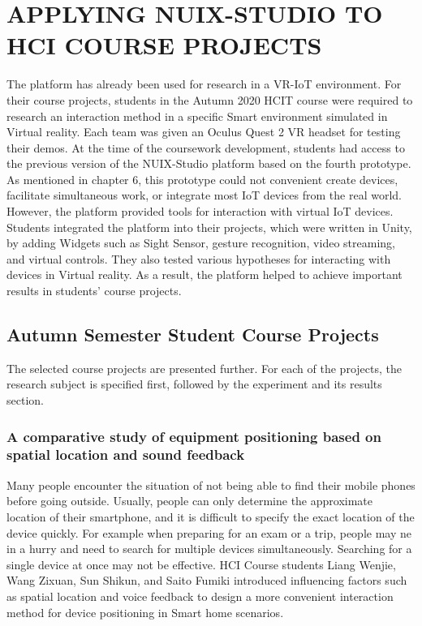 
\chapter{\MakeUppercase{Applying NUIX-Studio to HCI Course Projects}}

The platform has already been used for research in a VR-IoT environment.
For their course projects, students in the Autumn 2020 HCIT course were required to research an interaction method in a specific Smart environment simulated in Virtual reality. Each team was given an Oculus Quest 2 VR headset for testing their demos. At the time of the coursework development, students had access to the previous version of the NUIX-Studio platform based on the fourth prototype. As mentioned in chapter 6, this prototype could not convenient create devices, facilitate simultaneous work, or integrate most IoT devices from the real world. However, the platform provided tools for interaction with virtual IoT devices. Students integrated the platform into their projects, which were written in Unity, by adding Widgets such as Sight Sensor, gesture recognition, video streaming, and virtual controls. They also tested various hypotheses for interacting with devices in Virtual reality. As a result, the platform helped to achieve important results in students' course projects. 

\section{Autumn Semester Student Course Projects}

The selected course projects are presented further. For each of the projects, the research subject is specified first, followed by the experiment and its results section.


\subsection{A comparative study of equipment positioning based on spatial location and sound feedback}

Many people encounter the situation of not being able to find their mobile phones before going outside. Usually, people can only determine the approximate location of their smartphone, and it is difficult to specify the exact location of the device quickly. For example when preparing for an exam or a trip, people may ne in a hurry and need to search for multiple devices simultaneously. Searching for a single device at once may not be effective. HCI Course students Liang Wenjie, Wang Zixuan, Sun Shikun, and Saito Fumiki introduced influencing factors such as spatial location and voice feedback to design a more convenient interaction method for device positioning in Smart home scenarios. 

